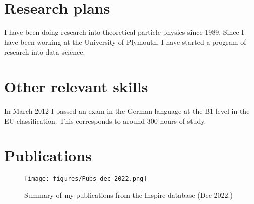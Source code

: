 \documentclass[12pt]{article}
\begin{document}
\section{Research plans}

I have been doing research into theoretical particle physics
since 1989. Since I have been working at the University of Plymouth,
I have started a program of research into data science.





\section{Other relevant skills}

In March 2012 I passed an exam in the German language
at the B1 level in the EU classification. 
This corresponds to around 300 hours of study.

\section{Publications}

\begin{figure}
\begin{center}
\texttt{[image: figures/Pubs\_dec\_2022.png]}
\end{center}
\caption {
Summary of my publications from the Inspire database (Dec 2022.)
}
\end{figure}






\end{document}
